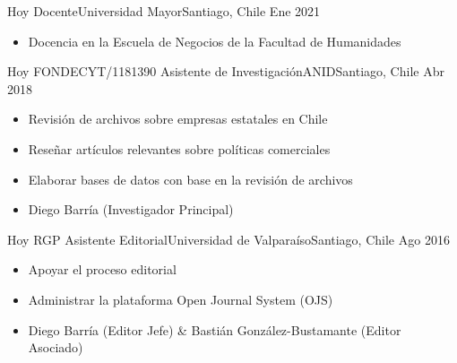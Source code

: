






\begin{experiences}
  \emptySeparator 
  \experience 
    {Hoy} {Docente}{Universidad Mayor}{Santiago, Chile} {Ene 2021}
    {\begin{itemize}
    \item Docencia en la Escuela de Negocios de la Facultad de Humanidades
    \end{itemize}}
    {}
\end{experiences}
\vspace{-2mm}

\begin{experiences}
  \emptySeparator 
  \experience 
    {Hoy} {FONDECYT/1181390 Asistente de Investigación}{ANID}{Santiago, Chile} {Abr 2018}
    {\begin{itemize}
    \item Revisión de archivos sobre empresas estatales en Chile
    \item Reseñar artículos relevantes sobre políticas comerciales
    \item Elaborar bases de datos con base en la revisión de archivos
    \item Diego Barría {\small (Investigador Principal)}
    \end{itemize}}
    {}
\end{experiences}
\vspace{-2mm}

\begin{experiences}
  \experience
    {Hoy} {RGP Asistente Editorial}{Universidad de Valparaíso}{Santiago, Chile} {Ago 2016}
    {\begin{itemize}
    \item Apoyar el proceso editorial
    \item Administrar la plataforma Open Journal System (OJS)
    \item Diego Barría {\small (Editor Jefe)} \& Bastián González-Bustamante {\small (Editor Asociado)}
    \end{itemize}}
    {}
\end{experiences}
\vspace{-2mm}

